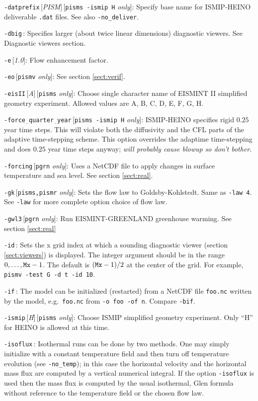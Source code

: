 \documentclass[11pt,final]{amsart}
\renewcommand{\t}[1]{\texttt{#1}}
\newcommand{\rawopt}[1]{\vspace{1mm}\noindent \Large\texttt{-#1}\normalsize}
\newcommand{\opt}[1]{\rawopt{#1}\,:\quad}
\newcommand{\optdef}[2]{\rawopt{#1}\,[\textsl{#2}]:\quad}
\newcommand{\optrestrict}[2]{\rawopt{#1}\,[\texttt{#2} \textsl{only}]:\quad}
\newcommand{\optdefrestrict}[3]{\rawopt{#1}\,[\textsl{#2}]\,[\texttt{#3} \textsl{only}]:\quad}
\newcommand{\und}{$\underline{\,\,\,}$}
\begin{document}
\optdefrestrict{datprefix}{PISM}{pisms -ismip H}  Specify base name for ISMIP-HEINO deliverable \verb|.dat| files.  See also \verb|-no_deliver|.

\opt{dbig}  Specifies larger (about twice linear dimensions) diagnostic viewers.  See Diagnostic viewers section.

\optdef{e}{1.0}  Flow enhancement factor.

\optrestrict{eo}{pismv}  See section \ref{sect:verif}.

\optdefrestrict{eisII}{A}{pisms}  Choose single character name of EISMINT II \cite{EISMINT00} simplified geometry experiment.  Allowed values are A, B, C, D, E, F, G, H.

\optrestrict{force\und quarter\und year}{pisms -ismip H}  ISMIP-HEINO specifies rigid $0.25$ year time steps.  This will violate both the diffusivity and the CFL parts of the adaptive time-stepping scheme.  This option overrides the adaptime time-stepping and does $0.25$ year time steps anyway; \emph{will probably cause blowup so don't bother}.

\optrestrict{forcing}{pgrn}    Uses a NetCDF file to apply changes in surface temperature and sea level. See section \ref{sect:real}.

\optrestrict{gk}{pisms,pismr}  Sets the flow law to Goldsby-Kohlstedt.  Same as \verb|-law 4|.  See \verb|-law| for more complete option choice of flow law.

\optrestrict{gwl3}{pgrn}    Run EISMINT-GREENLAND greenhouse warming. See section \ref{sect:real}

\opt{id}  Sets the x grid index at which a sounding diagnostic viewer (section \ref{sect:viewers}) is displayed.  The integer argument should be in the range $0,\dots,\text{\t{Mx}}-1$.  The default is $(\text{\t{Mx}}-1)/2$ at the center of the grid.  For example, \verb|pismv -test G -d t -id 10|.

\opt{if}  The model can be initialized (restarted) from a NetCDF file \verb|foo.nc| written by the model, e.g.~\verb|foo.nc| from \verb|-o foo -of n|.  Compare \verb|-bif|.

\optdefrestrict{ismip}{H}{pisms}  Choose ISMIP simplified geometry experiment.  Only ``H'' for HEINO is allowed at this time.

\opt{isoflux}  Isothermal runs can be done by two methods.  One may simply initialize with a constant temperature field and then turn off temperature evolution (see \verb|-no_temp|); in this case the horizontal velocity and the horizontal mass flux are computed by a vertical numerical integral.  If the option \verb|-isoflux| is used then the mass flux is computed by the usual isothermal, Glen formula without reference to the temperature field or the chosen flow law.
\end{document}
